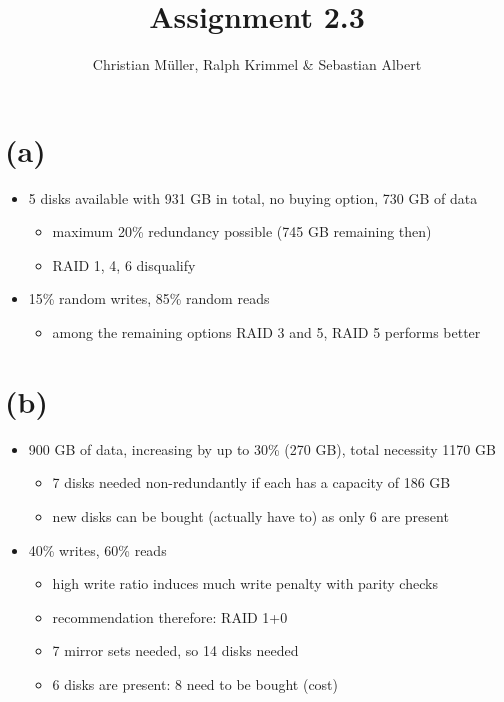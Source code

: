 \documentclass{article}
\begin{document}
\title{Assignment 2.3}
\author{Christian Müller, Ralph Krimmel \& Sebastian Albert}
\maketitle
\section*{(a)}
\begin{itemize}
\item 5 disks available with 931 GB in total, no buying option, 730 GB of data
\begin{itemize}
\item maximum 20\% redundancy possible (745 GB remaining then)
\item RAID 1, 4, 6 disqualify
\end{itemize}
\item 15\% random writes, 85\% random reads
\begin{itemize}
\item among the remaining options RAID 3 and 5, RAID 5 performs better
\end{itemize}
\end{itemize}
\section*{(b)}
\begin{itemize}
\item 900 GB of data, increasing by up to 30\% (270 GB), total necessity 1170 GB
\begin{itemize}
\item 7 disks needed non-redundantly if each has a capacity of 186 GB
\item new disks can be bought (actually have to) as only 6 are present
\end{itemize}
\item 40\% writes, 60\% reads
\begin{itemize}
\item high write ratio induces much write penalty with parity checks
\item recommendation therefore: RAID 1+0
\item 7 mirror sets needed, so 14 disks needed
\item 6 disks are present: 8 need to be bought (cost)
\end{itemize}
\end{itemize}
\end{document}
